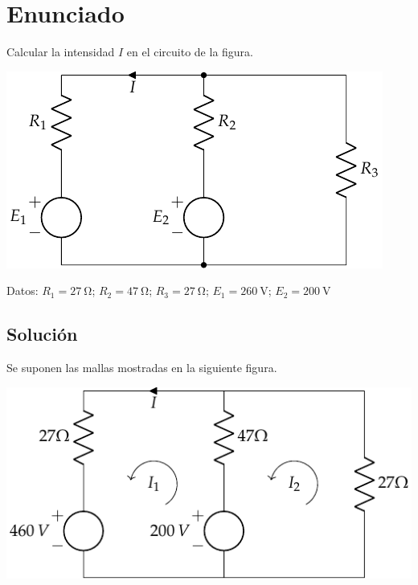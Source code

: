 
\section{Enunciado}
Calcular la intensidad $I$ en el circuito de la figura.

\begin{center}
  \includegraphics{figuras/BT1_04.pdf}
\end{center}

  Datos: $R_1 = \qty{27}{\ohm}$; $R_2 = \qty{47}{\ohm}$; $R_3 = \qty{27}{\ohm}$; $E_1 = \qty{260}{\volt}$; $E_2 = \qty{200}{\volt}$

\subsection*{Solución}
Se suponen las mallas mostradas en la siguiente figura.

\begin{center}
  \includegraphics{figuras/BT1_04_mallas.pdf}
\end{center}

